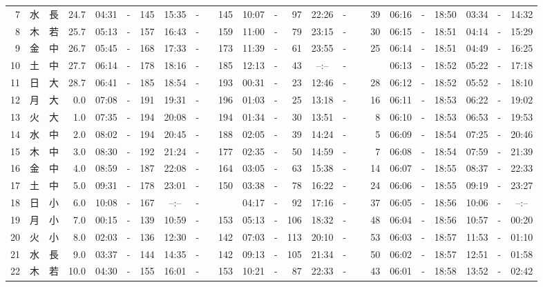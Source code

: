 \documentclass[12pt,a4j]{jsarticle}
\begin{document}
\begin{table}[htbp]
\begin{center}
{\begin{tabular}{|rc|cr|ccrccr|ccrccr|ccc|ccc|}
 7 & 水 & 長 & 24.7 &  04:31 &-& 145 &  15:35 &-& 145 &  10:07 &-&  97 &  22:26 &-&  39 & 06:16 & -& 18:50 & 03:34 & -& 14:32 \\
 8 & 木 & 若 & 25.7 &  05:13 &-& 157 &  16:43 &-& 159 &  11:00 &-&  79 &  23:15 &-&  30 & 06:15 & -& 18:51 & 04:14 & -& 15:29 \\
 9 & 金 & 中 & 26.7 &  05:45 &-& 168 &  17:33 &-& 173 &  11:39 &-&  61 &  23:55 &-&  25 & 06:14 & -& 18:51 & 04:49 & -& 16:25 \\
10 & 土 & 中 & 27.7 &  06:14 &-& 178 &  18:16 &-& 185 &  12:13 &-&  43 &  --:-- &-&~~~~~ & 06:13 & -& 18:52 & 05:22 & -& 17:18 \\
11 & 日 & 大 & 28.7 &  06:41 &-& 185 &  18:54 &-& 193 &  00:31 &-&  23 &  12:46 &-&  28 & 06:12 & -& 18:52 & 05:52 & -& 18:10 \\
12 & 月 & 大 &  0.0 &  07:08 &-& 191 &  19:31 &-& 196 &  01:03 &-&  25 &  13:18 &-&  16 & 06:11 & -& 18:53 & 06:22 & -& 19:02 \\
13 & 火 & 大 &  1.0 &  07:35 &-& 194 &  20:08 &-& 194 &  01:34 &-&  30 &  13:51 &-&   8 & 06:10 & -& 18:53 & 06:53 & -& 19:53 \\
14 & 水 & 中 &  2.0 &  08:02 &-& 194 &  20:45 &-& 188 &  02:05 &-&  39 &  14:24 &-&   5 & 06:09 & -& 18:54 & 07:25 & -& 20:46 \\
15 & 木 & 中 &  3.0 &  08:30 &-& 192 &  21:24 &-& 177 &  02:35 &-&  50 &  14:59 &-&   7 & 06:08 & -& 18:54 & 07:59 & -& 21:39 \\
16 & 金 & 中 &  4.0 &  08:59 &-& 187 &  22:08 &-& 164 &  03:05 &-&  63 &  15:38 &-&  14 & 06:07 & -& 18:55 & 08:37 & -& 22:33 \\
17 & 土 & 中 &  5.0 &  09:31 &-& 178 &  23:01 &-& 150 &  03:38 &-&  78 &  16:22 &-&  24 & 06:06 & -& 18:55 & 09:19 & -& 23:27 \\
18 & 日 & 小 &  6.0 &  10:08 &-& 167 &  --:-- &-&~~~~~ &  04:17 &-&  92 &  17:16 &-&  37 & 06:05 & -& 18:56 & 10:06 & -& --:-- \\
19 & 月 & 小 &  7.0 &  00:15 &-& 139 &  10:59 &-& 153 &  05:13 &-& 106 &  18:32 &-&  48 & 06:04 & -& 18:56 & 10:57 & -& 00:20 \\
20 & 火 & 小 &  8.0 &  02:03 &-& 136 &  12:30 &-& 142 &  07:03 &-& 113 &  20:10 &-&  53 & 06:03 & -& 18:57 & 11:53 & -& 01:10 \\
21 & 水 & 長 &  9.0 &  03:37 &-& 144 &  14:35 &-& 142 &  09:13 &-& 105 &  21:34 &-&  50 & 06:02 & -& 18:57 & 12:51 & -& 01:58 \\
22 & 木 & 若 & 10.0 &  04:30 &-& 155 &  16:01 &-& 153 &  10:21 &-&  87 &  22:33 &-&  43 & 06:01 & -& 18:58 & 13:52 & -& 02:42 \\

\end{tabular}}
\end{center}
\end{table}
\end{document}
